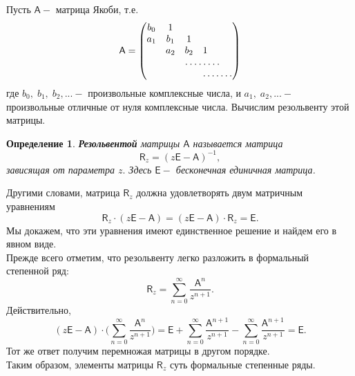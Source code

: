 \documentclass[12 pt, a4 paper]{article}
\theoremstyle{plain}   \newtheorem{Pro}{Задача}
\newtheorem{Def}{Определение}
\begin{document}
Пусть
$ \mathsf{A} - $
матрица Якоби, т.е.
\begin{equation*}
  \mathsf{A}=
    \begin{pmatrix}
	  b_0 & 1 & \; & \; & \; & \; \\
	  a_1 & b_1 & 1 & \; & \; & \; \\
	  \; & a_2 & b_2 & 1 & \; & \; \\
	  \; & \; & \hdotsfor{3}  & \; \\
	  \; & \; & \; & \hdotsfor{3}
	\end{pmatrix}
\end{equation*}
где
$ b_0 , \; b_1 , \; b_2 ,... - $
произвольные комплексные числа, и
$ a_1 , \; a_2 ,... - $
произвольные отличные от нуля комплексные числа.
Вычислим резольвенту этой матрицы.
\begin{Def}
{\bfseries Резольвентой} матрицы
$ \mathsf{A} $
называется матрица
$$
  \mathsf{R}_z =(z \mathsf{E} - \mathsf{A} ) ^{-1},
$$
зависящая от параметра
$ z . $
Здесь
$ \mathsf{E} - $
бесконечная единичная матрица.
\end{Def}
Другими словами, матрица
$ \mathsf{R}_z $
должна удовлетворять двум матричным уравнениям
$$
  \mathsf{R}_z \cdot (z \mathsf{E} - \mathsf{A} ) =
  (z \mathsf{E} - \mathsf{A} ) \cdot \mathsf{R}_z =
  \mathsf{E} .
$$
Мы докажем, что эти уравнения имеют единственное решение и
найдем его в явном виде.
\\

Прежде всего отметим, что резольвенту легко разложить в
формальный степенной ряд:
$$
  \mathsf{R}_z = \sum _{n=0}^{\infty}
  \frac{ \mathsf{A}^n }{z^{n+1} }.
$$
Действительно,
$$
  (z \mathsf{E} - \mathsf{A} ) \cdot
  \biggl ( \sum _{n=0}^{\infty}
  \frac{\mathsf{A}^n }{z^{n+1}} \biggr ) =
  \mathsf{E}+\sum _{n=0}^{\infty}
  \frac{\mathsf{A}^{n+1}}{z^{n+1}}-
  \sum _{n=0}^{\infty} \frac{ \mathsf{A}^{n+1}}
  {z^{n+1}}= \mathsf{E}.
$$
Тот же ответ получим перемножая матрицы в другом порядке.\\
Таким образом, элементы матрицы
$ \mathsf{R}_z $
суть формальные степенные ряды.
\\
\end{document}
